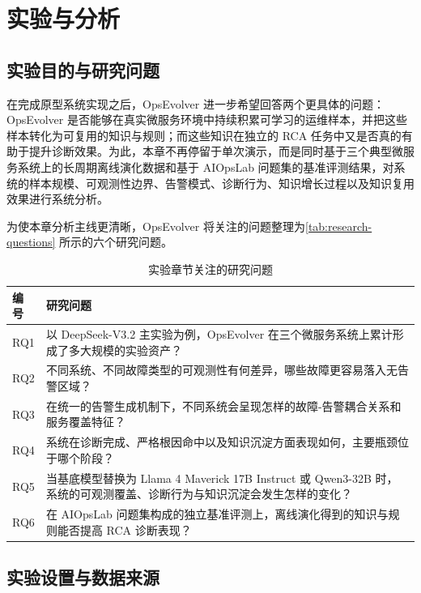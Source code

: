 \chapter{实验与分析}
\label{cha:experiments}

\section{实验目的与研究问题}
\label{sec:exp_goal}

在完成原型系统实现之后，OpsEvolver 进一步希望回答两个更具体的问题：OpsEvolver 是否能够在真实微服务环境中持续积累可学习的运维样本，并把这些样本转化为可复用的知识与规则；而这些知识在独立的 RCA 任务中又是否真的有助于提升诊断效果。为此，本章不再停留于单次演示，而是同时基于三个典型微服务系统上的长周期离线演化数据和基于 AIOpsLab 问题集的基准评测结果，对系统的样本规模、可观测性边界、告警模式、诊断行为、知识增长过程以及知识复用效果进行系统分析。

为使本章分析主线更清晰，OpsEvolver 将关注的问题整理为\autoref{tab:research-questions} 所示的六个研究问题。

\begin{table}[htbp]
    \centering
    \caption{实验章节关注的研究问题}
    \label{tab:research-questions}
    \small
    \begin{tabular}{>{\centering\arraybackslash}m{0.8cm}>{\centering\arraybackslash}m{10.0cm}}
        \toprule
        编号 & 研究问题 \\
        \midrule
        RQ1 & 以 DeepSeek-V3.2 主实验为例，OpsEvolver 在三个微服务系统上累计形成了多大规模的实验资产？ \\
        RQ2 & 不同系统、不同故障类型的可观测性有何差异，哪些故障更容易落入无告警区域？ \\
        RQ3 & 在统一的告警生成机制下，不同系统会呈现怎样的故障-告警耦合关系和服务覆盖特征？ \\
        RQ4 & 系统在诊断完成、严格根因命中以及知识沉淀方面表现如何，主要瓶颈位于哪个阶段？ \\
        RQ5 & 当基底模型替换为 Llama 4 Maverick 17B Instruct 或 Qwen3-32B 时，系统的可观测覆盖、诊断行为与知识沉淀会发生怎样的变化？ \\
        RQ6 & 在 AIOpsLab 问题集构成的独立基准评测上，离线演化得到的知识与规则能否提高 RCA 诊断表现？ \\
        \bottomrule
    \end{tabular}
\end{table}

\section{实验设置与数据来源}
\label{sec:exp_setup}

